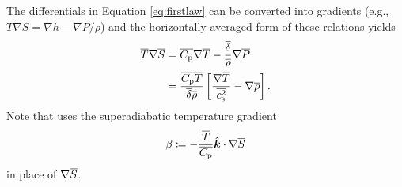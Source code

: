 \documentclass[12pt]{article}
\newcommand{\veck}{\hat{\bm{k}}}
\newcommand{\deltaref}{\overline{\delta}}
\newcommand{\cpref}{\overline{\cpcap}}
\newcommand{\cssqref}{\overline{\cs^2}}
\begin{document}
  The differentials in Equation \eqref{eq:firstlaw} can be converted into gradients (e.g., $T\nabla S= \nabla h - \nabla P/\rho$) and the horizontally averaged form of these relations yields 
  \begin{subequations}
  \begin{align}
  	\tmpref\nabla\sref &= \cpref\nabla\tmpref - \frac{\deltaref}{\rhoref}\nabla\prsref\\
  	 &= \frac{\cpref\tmpref}{\deltaref\rhoref}\left[\frac{\nabla\tmpref}{\cssqref}-\nabla\rhoref\right].
  \end{align}
  \end{subequations}
  Note that \citet{Gough1969} uses the superadiabatic temperature gradient
  \begin{align}
  	\beta\define -\frac{\tmpref}{\cpref}\veck\dotgrad\sref
  \end{align}
  in place of $\nabla \overline{S}$. 
  
\end{document}
